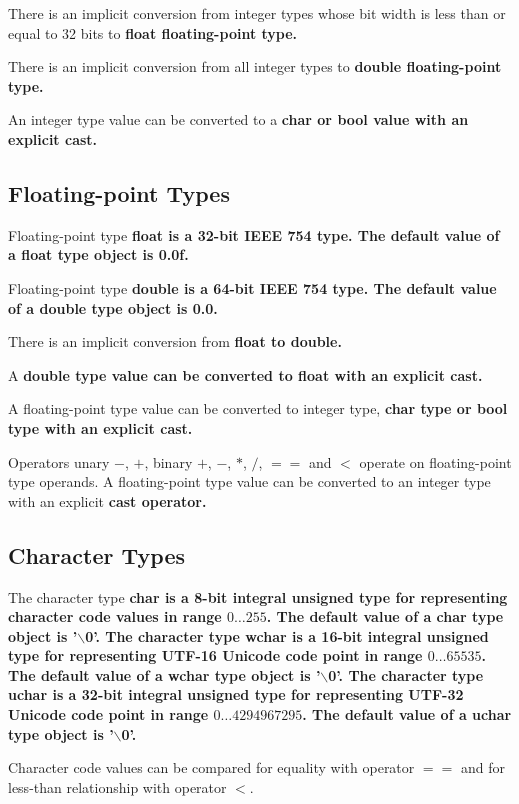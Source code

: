 \documentclass[a4paper,oneside,11pt]{article}
\begin{document}
There is an implicit conversion from integer types whose bit width is less than or equal to 32 bits to \bf{float} floating-point type.

There is an implicit conversion from all integer types to \bf{double} floating-point type.

An integer type value can be converted to a \bf{char} or \bf{bool} value with an explicit \bf{cast}.

\subsection{Floating-point Types}

Floating-point type \bf{float} is a 32-bit IEEE 754 type.
The default value of a \bf{float} type object is 0.0f.

Floating-point type \bf{double} is a 64-bit IEEE 754 type.
The default value of a \bf{double} type object is 0.0.

There is an implicit conversion from \bf{float} to \bf{double}.

A \bf{double} type value can be converted to \bf{float} with an explicit \bf{cast}.

A floating-point type value can be converted to integer type, \bf{char} type or \bf{bool} type with an explicit \bf{cast}.

Operators unary $-$, $+$, binary $+$, $-$, $*$, $/$, $==$ and $<$ operate on floating-point type operands.
A floating-point type value can be converted to an integer type with an explicit \bf{cast} operator.

\subsection{Character Types}

The character type \bf{char} is a 8-bit integral unsigned type for representing character code values in range $0 \ldots 255$.
The default value of a \bf{char} type object is '$\backslash$0'.
The character type \bf{wchar} is a 16-bit integral unsigned type for representing UTF-16 Unicode code point in range $0 \ldots 65535$.
The default value of a \bf{wchar} type object is '$\backslash$0'.
The character type \bf{uchar} is a 32-bit integral unsigned type for representing UTF-32 Unicode code point in range $0 \ldots 4294967295$.
The default value of a \bf{uchar} type object is '$\backslash$0'.

Character code values can be compared for equality with operator $==$ and for less-than relationship with operator $<$.
\end{document}
